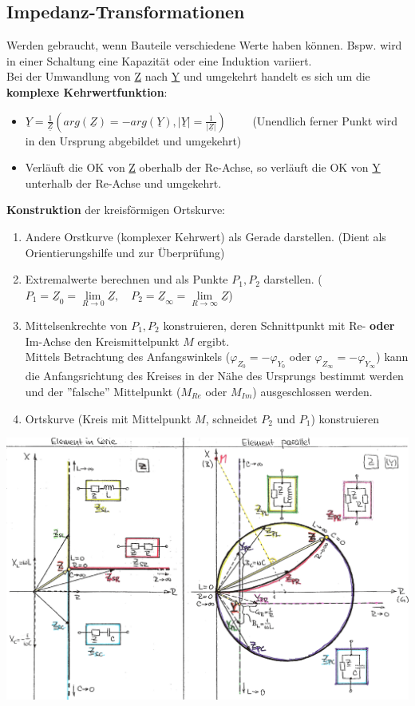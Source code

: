 \subsection{Impedanz-Transformationen}
Werden gebraucht, wenn Bauteile verschiedene Werte haben können. Bspw. wird in
einer Schaltung eine Kapazität oder eine Induktion variiert.\\
Bei der Umwandlung von \underline{Z} nach \underline{Y} und umgekehrt handelt es sich um die
\textbf{komplexe Kehrwertfunktion}: 
\begin{itemize}
  \item $\underline{Y} = \frac{1}{\underline{Z}} 
  ( arg(\underline{Z}) = -arg(\underline{Y}),  
  |\underline{Y}| = \frac{1}{| \underline{Z} |}) \qquad$
  (Unendlich ferner Punkt wird in den Ursprung abgebildet und umgekehrt)
  \item Verläuft die OK von \underline{Z} oberhalb der Re-Achse, so verläuft die OK von
  \underline{Y} unterhalb der Re-Achse und umgekehrt.
\end{itemize} 
\textbf{Konstruktion} der kreisförmigen Ortskurve:
\begin{enumerate}
  \item Andere Orstkurve (komplexer Kehrwert) als Gerade darstellen. (Dient als Orientierungshilfe
  und zur Überprüfung)
  \item Extremalwerte berechnen und als Punkte $P_1, P_2$ darstellen. 
	($P_1 = \underline{Z}_0 = \lim\limits_{R \rightarrow 0}\underline{Z}, \quad
	  P_2 = \underline{Z}_\infty = \lim\limits_{R \rightarrow \infty}\underline{Z} $)
  \item Mittelsenkrechte von $P_1, P_2$ konstruieren, deren Schnittpunkt mit Re- \textbf{oder}
  Im-Achse den Kreismittelpunkt $M$ ergibt. \\
  Mittels Betrachtung des Anfangswinkels ($\varphi_{Z_0} = - \varphi_{Y_0}$  oder
  $\varphi_{Z_\infty} = - \varphi_{Y_\infty}$) kann die Anfangsrichtung des Kreises in
  der Nähe des Ursprungs bestimmt werden und der ''falsche'' Mittelpunkt ($M_{Re}$ oder $M_{Im}$)
  ausgeschlossen werden.
  \item Ortskurve (Kreis mit Mittelpunkt $M$, schneidet $P_2$ und $P_1$) konstruieren
\end{enumerate}

\includegraphics[width=18cm]{./bilder/impedanztrafo.png}